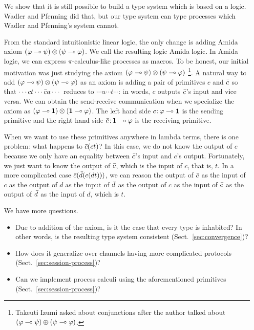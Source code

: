 We show that it is still possible to build
a type system which is based on a logic.
Wadler and Pfenning did that, but our type system can type processes
which Wadler
and Pfenning's system cannot.

From the standard intuitionistic linear logic,
the only change is adding Amida axiom
$(\varphi\multimap\psi)\otimes(\psi\multimap\varphi)$.
We call the resulting logic Amida logic.
In Amida logic, we can express $\pi$-calculus-like processes as macros.
To be honest, our initial motivation was just studying the axiom
$(\varphi\multimap\psi)\otimes(\psi\multimap\varphi)$%
\footnote{Takeuti Izumi asked about conjunctions
after the author talked about $(\varphi\multimap\psi)\oplus (\psi\multimap\varphi)$.}.
A natural way to add $(\varphi\multimap\psi)\otimes(\psi\multimap\varphi)$ as an axiom
is adding a pair of primitives $c$ and $\bar{c}$ so that
$\cdots ct \cdots \bar{c} u \cdots$ reduces to
$\cdots u  \cdots t \cdots$: in words,
$c$ outputs $\bar{c}$'s input and vice versa.
We can obtain the send-receive communication when we specialize the
axiom as $(\varphi\multimap \mathbf{1})\otimes(\mathbf{1}\multimap\varphi)$.  The left hand side
${c} \mathord{\colon\kern -2pt}{\varphi\multimap\mathbf{1}}$ is the sending primitive and
the right hand side ${\bar{c}} \mathord{\colon\kern -2pt}{\mathbf{1} \multimap\varphi}$ is the receiving
primitive.

When we want to use these primitives anywhere in lambda terms,
there is one problem: what happens to $\bar{c}(c t)$?
In this case, we do not know the output of $c$ because we only have an
equality between $\bar{c}$'s input and $c$'s output.
Fortunately, we just want to know the output of $\bar{c}$, which is the
input of $c$, that is, $t$.
In a more complicated case $\bar{c}(\bar{d}(c (d t)))$,
we can reason the output of $\bar{c}$ as the input of $c$ as the output of
$d$ as the input of $\bar{d}$ as the output of $c$ as the input of $\bar{c}$
as the output of $\bar{d}$ as the input of $d$, which is $t$.

We have more questions.
\begin{itemize}
 \item Due to addition of the axiom, is it the case that
       every type is inhabited?  In other words,
      is the resulting type system consistent (Sect.~\ref{sec:convergence})?
 \item How does it generalize over channels having more complicated
       protocols (Sect.~\ref{sec:session-process})?
 \item Can we implement process calculi using the aforementioned
       primitives (Sect.~\ref{sec:session-process})?
\end{itemize}

